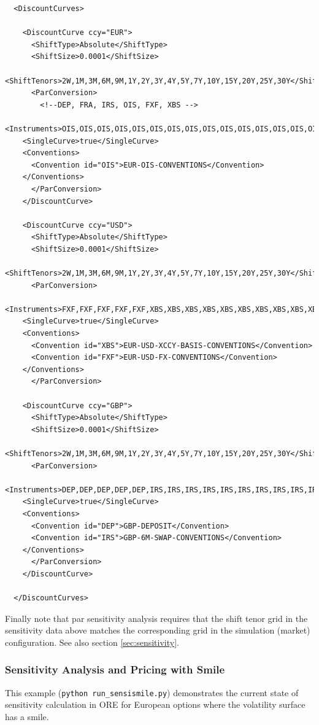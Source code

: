 \begin{verbatim}
  <DiscountCurves>
  
    <DiscountCurve ccy="EUR">
      <ShiftType>Absolute</ShiftType>
      <ShiftSize>0.0001</ShiftSize>
      <ShiftTenors>2W,1M,3M,6M,9M,1Y,2Y,3Y,4Y,5Y,7Y,10Y,15Y,20Y,25Y,30Y</ShiftTenors>
      <ParConversion>
        <!--DEP, FRA, IRS, OIS, FXF, XBS -->
	<Instruments>OIS,OIS,OIS,OIS,OIS,OIS,OIS,OIS,OIS,OIS,OIS,OIS,OIS,OIS,OIS,OIS</Instruments>
	<SingleCurve>true</SingleCurve>
	<Conventions>
	  <Convention id="OIS">EUR-OIS-CONVENTIONS</Convention>
	</Conventions>
      </ParConversion>
    </DiscountCurve>   
    
    <DiscountCurve ccy="USD">
      <ShiftType>Absolute</ShiftType>
      <ShiftSize>0.0001</ShiftSize>
      <ShiftTenors>2W,1M,3M,6M,9M,1Y,2Y,3Y,4Y,5Y,7Y,10Y,15Y,20Y,25Y,30Y</ShiftTenors>
      <ParConversion>
	<Instruments>FXF,FXF,FXF,FXF,FXF,XBS,XBS,XBS,XBS,XBS,XBS,XBS,XBS,XBS,XBS,XBS</Instruments>
	<SingleCurve>true</SingleCurve>
	<Conventions>
	  <Convention id="XBS">EUR-USD-XCCY-BASIS-CONVENTIONS</Convention>
	  <Convention id="FXF">EUR-USD-FX-CONVENTIONS</Convention>
	</Conventions>
      </ParConversion>

    <DiscountCurve ccy="GBP">
      <ShiftType>Absolute</ShiftType>
      <ShiftSize>0.0001</ShiftSize>
      <ShiftTenors>2W,1M,3M,6M,9M,1Y,2Y,3Y,4Y,5Y,7Y,10Y,15Y,20Y,25Y,30Y</ShiftTenors>
      <ParConversion>
	<Instruments>DEP,DEP,DEP,DEP,DEP,IRS,IRS,IRS,IRS,IRS,IRS,IRS,IRS,IRS,IRS,IRS</Instruments>
	<SingleCurve>true</SingleCurve>
	<Conventions>
	  <Convention id="DEP">GBP-DEPOSIT</Convention>
	  <Convention id="IRS">GBP-6M-SWAP-CONVENTIONS</Convention>
	</Conventions>
      </ParConversion>
    </DiscountCurve>
  
  </DiscountCurves>
\end{verbatim}

Finally note that par sensitivity analysis requires that the shift tenor grid in the sensitivity data above matches the corresponding grid in the simulation (market) configuration.
See also section \ref{sec:sensitivity}.

\subsubsection{Sensitivity Analysis and Pricing with Smile}

This example ({\tt python run\_sensismile.py}) demonstrates the current state of sensitivity calculation in ORE for European options where the volatility surface has a smile. 

